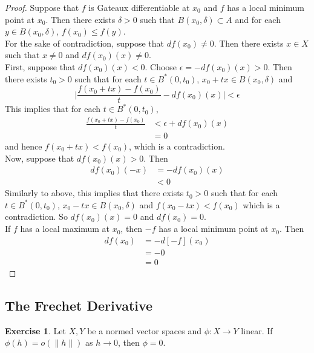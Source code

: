 \documentclass[12pt]{amsart}
\theoremstyle{definition}
\theoremstyle{remark}
\theoremstyle{definition}
\newtheorem{ex}[definition]{Exercise}
\newcommand{\del}{\delta}
\newcommand{\ep}{\epsilon}
\begin{document}
	\begin{proof}
	Suppose that $f$ is Gateaux differentiable at $x_0$ and $f$ has a local minimum point at $x_0$. Then there exists $\del >0 $ such that $B(x_0, \del) \subset A$ and for each $y \in B(x_0, \del)$, $f(x_0) \leq f(y)$. \\
	For the sake of contradiction, suppose that $df(x_0) \neq 0$. Then there exists $x \in X$ such that $x \neq 0$ and $df(x_0)(x) \neq 0$. \\
	First, suppose that $df(x_0)(x) < 0$. Choose $\ep = -df(x_0)(x) >0$. Then there exists $t_0 >0$ such that for each $t \in B^*(0, t_0)$, $x_0 + tx \in B(x_0, \del)$ and $$\bigg | \frac{f(x_0 + tx) - f(x_0)}{t} - df(x_0)(x) \bigg | < \ep$$ 
	This implies that for each $t \in B^*(0, t_0)$,
	\begin{align*}
	\frac{f(x_0 + tx) - f(x_0)}{t}  
	&< \ep + df(x_0)(x) \\
	&= 0
	\end{align*} 
	and hence $f(x_0 + tx) < f(x_0)$, which is a contradiction. \\
	Now, suppose that $df(x_0)(x) > 0$. Then 
	\begin{align*}
	df(x_0)(-x) 
	&= -df(x_0)(x) \\
	& < 0
	\end{align*}
	Similarly to above, this implies that there exists $t_0 >0$ such that for each $t \in B^*(0, t_0)$, $x_0 - tx \in B(x_0, \del)$ and $f(x_0 - tx) < f(x_0)$ which is a contradiction. So $df(x_0)(x) = 0$ and $df(x_0) = 0$. \\
	If $f$ has a local maximum at $x_0$, then $-f$ has a local minimum point at $x_0$. Then 
	\begin{align*}
	df(x_0)
	&= -d[-f](x_0) \\
	&= -0 \\
	&= 0
\end{align*}	 
	\end{proof}
	
	
	
	
	
	
	
	
	
	
	
	
	
	
	
	
	\newpage
	\subsection{The Frechet Derivative}
	
	\begin{ex}
	Let $X,Y$ be a normed vector spaces and $\phi: X \rightarrow Y$ linear. If $\phi(h) = o(\|h\|)$ as $h \rightarrow 0$, then $\phi = 0$. 
	\end{ex}
	
\end{document}
